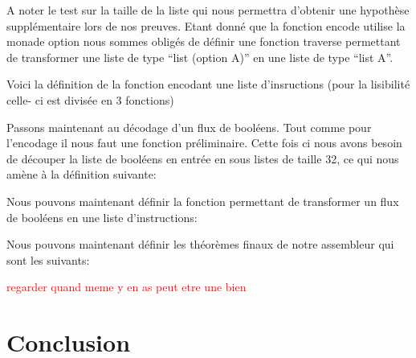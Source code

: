 \documentclass {article}
\newcommand{\codefrom}[3]
           {}
\theoremstyle{definition}
\theoremstyle{remark}
\newcommand{\todo}[1]{\textcolor{red}{#1}}
\begin{document}
\codefrom{src}{encode}{concat_listes_32}

A noter le test sur la taille de la liste
qui nous permettra d'obtenir une hypothèse supplémentaire lors de nos preuves.
Etant donné que la fonction encode utilise la monade option nous sommes obligés de définir une fonction
traverse permettant de transformer une liste de type ``list (option A)'' en une liste de type ``list A''.

\codefrom{src}{encode}{traverse}

Voici la définition de la fonction encodant une liste d'insructions (pour la lisibilité celle- ci est
divisée en 3 fonctions)

\codefrom{src}{encode}{encode_flux}

Passons maintenant au décodage d'un flux de booléens. Tout comme pour l'encodage il nous faut
une fonction préliminaire. Cette fois ci nous avons besoin de découper la liste de booléens
en entrée en sous listes de taille 32, ce qui nous amène à la définition suivante:

\codefrom{src}{encode}{cut_32}

Nous pouvons maintenant définir la fonction permettant de transformer un flux de booléens
en une liste d'instructions:

\codefrom{src}{encode}{decode_flux}



Nous pouvons maintenant définir les théorèmes finaux de notre assembleur qui sont les suivants:

\codefrom{src}{encode}{encode_decode_flux_decoup}

\codefrom{src}{encode}{decode_flux_decoup_encode}

\todo{regarder quand meme y en as peut etre une bien}






\section{Conclusion}
\end{document}
